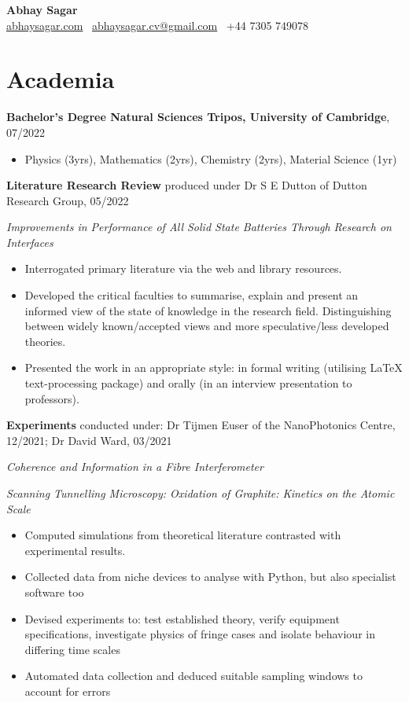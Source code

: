 \documentclass[a4paper]{article}
\begin{document}
\begin{center}
	{\huge\textbf{Abhay Sagar}}\\
	\href{https://www.abhaysagar.com}{abhaysagar.com} \textbar \ \href{mailto:abhaysagar.cv@gmail.com}{abhaysagar.cv@gmail.com} \textbar \ +44 7305 749078
\end{center}



\section{Academia}
\textbf{Bachelor's Degree Natural Sciences Tripos, University of Cambridge}, 07/2022

\begin{itemize}
	\item[]Physics (3yrs), Mathematics (2yrs), Chemistry (2yrs), Material Science (1yr)
\end{itemize}

\noindent\textbf{Literature Research Review} produced under Dr S E Dutton of Dutton Research Group, 05/2022

\textit{Improvements in Performance of All Solid State Batteries Through Research on Interfaces}

\begin{itemize}
	\item Interrogated primary literature via the web and library resources.
	\item Developed the critical faculties to summarise, explain and present an informed view of the state of knowledge in the research field. Distinguishing between widely known/accepted views and more speculative/less developed theories.
	\item Presented the work in an appropriate style: in formal writing (utilising LaTeX text-processing package) and orally (in an interview presentation to professors).
\end{itemize}


\noindent\textbf{Experiments} conducted under: Dr Tijmen Euser of the NanoPhotonics Centre, 12/2021; Dr David Ward, 03/2021

\textit{Coherence and Information in a Fibre Interferometer}

\textit{Scanning Tunnelling Microscopy: Oxidation of Graphite: Kinetics on the Atomic Scale}

\begin{itemize}
	\item Computed simulations from theoretical literature contrasted with experimental results.
	\item Collected data from niche devices to analyse with Python, but also specialist software too
	\item Devised experiments to: test established theory, verify equipment specifications, investigate
		physics of fringe cases and isolate behaviour in differing time scales
	\item Automated data collection and deduced suitable sampling windows to account for errors
\end{itemize}
\end{document}

